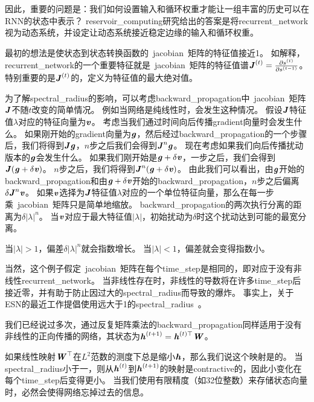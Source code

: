 因此，重要的问题是：我们如何设置输入和循环权重才能让一组丰富的历史可以在\gls{RNN}的状态中表示？
\gls{reservoir_computing}研究给出的答案是将\gls{recurrent_network}视为动态系统，并设定让动态系统接近稳定边缘的输入和循环权重。

最初的想法是使状态到状态转换函数的~\gls{jacobian}~矩阵的特征值接近1。
如解释，\gls{recurrent_network}的一个重要特征就是~\gls{jacobian}~矩阵的特征值谱$\boldsymbol{\mathit{J}}^{(t)} = \frac{\partial s^{(t)}}{\partial s^{(t-1)}}$。
特别重要的是$\boldsymbol{\mathit{J}}^{(t)}$的，定义为特征值的最大绝对值。

为了解\gls{spectral_radius}的影响，可以考虑\gls{backward_propagation}中~\gls{jacobian}~矩阵$\boldsymbol{\mathit{J}}$不随$t$改变的简单情况。
例如当网络是纯线性时，会发生这种情况。
假设$\boldsymbol{\mathit{J}}$特征值$\lambda$对应的特征向量为$\boldsymbol{\mathit{v}}$。
考虑当我们通过时间向后传播\gls{gradient}向量时会发生什么。
如果刚开始的\gls{gradient}向量为$\boldsymbol{\mathit{g}}$，然后经过\gls{backward_propagation}的一个步骤后，我们将得到$\boldsymbol{\mathit{J}} \boldsymbol{\mathit{g}}$，$n$步之后我们会得到$\boldsymbol{\mathit{J}}^n \boldsymbol{\mathit{g}}$。
现在考虑如果我们向后传播扰动版本的$\boldsymbol{\mathit{g}}$会发生什么。
如果我们刚开始是$\boldsymbol{\mathit{g}} + \delta \boldsymbol{\mathit{v}}$，一步之后，我们会得到$\boldsymbol{\mathit{J}}(\boldsymbol{\mathit{g}} + \delta \boldsymbol{\mathit{v}})$。
$n$步之后，我们将得到$\boldsymbol{\mathit{J}}^n(\boldsymbol{\mathit{g}} + \delta \boldsymbol{\mathit{v}})$。
由此我们可以看出，由$\boldsymbol{\mathit{g}}$开始的\gls{backward_propagation}和由$\boldsymbol{\mathit{g}}+\delta \boldsymbol{\mathit{v}}$开始的\gls{backward_propagation}，$n$步之后偏离$\delta \boldsymbol{\mathit{J}}^n \boldsymbol{\mathit{v}}$。
如果$\boldsymbol{\mathit{v}}$选择为$\boldsymbol{\mathit{J}}$特征值$\lambda$对应的一个单位特征向量，那么在每一步乘~\gls{jacobian}~矩阵只是简单地缩放。
\gls{backward_propagation}的两次执行分离的距离为$\delta | \lambda |^n$。
当$\boldsymbol{\mathit{v}}$对应于最大特征值$|\lambda|$，初始扰动为$\delta$时这个扰动达到可能的最宽分离。

当$ | \lambda | > 1$，偏差$\delta | \lambda |^n$就会指数增长。
当$ | \lambda | < 1$，偏差就会变得指数小。


当然，这个例子假定~\gls{jacobian}~矩阵在每个\gls{time_step}是相同的，即对应于没有非线性\gls{recurrent_network}。
当非线性存在时，非线性的导数将在许多\gls{time_step}后接近零，并有助于防止因过大的\gls{spectral_radius}而导致的爆炸。
事实上，关于\gls{ESN}的最近工作提倡使用远大于1的\gls{spectral_radius}~\citep{yildiz2012re,jaeger2012long}。

我们已经说过多次，通过反复矩阵乘法的\gls{backward_propagation}同样适用于没有非线性的正向传播的网络，其状态为$\boldsymbol{\mathit{h}}^{(t+1)} = \boldsymbol{\mathit{h}}^{(t)\top} \boldsymbol{\mathit{W}} $。

如果线性映射$\boldsymbol{\mathit{W}}^\top$在$L^2$范数的测度下总是缩小$\boldsymbol{\mathit{h}}$，那么我们说这个映射是的。
当\gls{spectral_radius}小于一，则从$\boldsymbol{\mathit{h}}^{(t)}$到$\boldsymbol{\mathit{h}}^{(t+1)}$的映射是\gls{contractive}的，因此小变化在每个\gls{time_step}后变得更小。
当我们使用有限精度（如32位整数）来存储状态向量时，必然会使得网络忘掉过去的信息。

